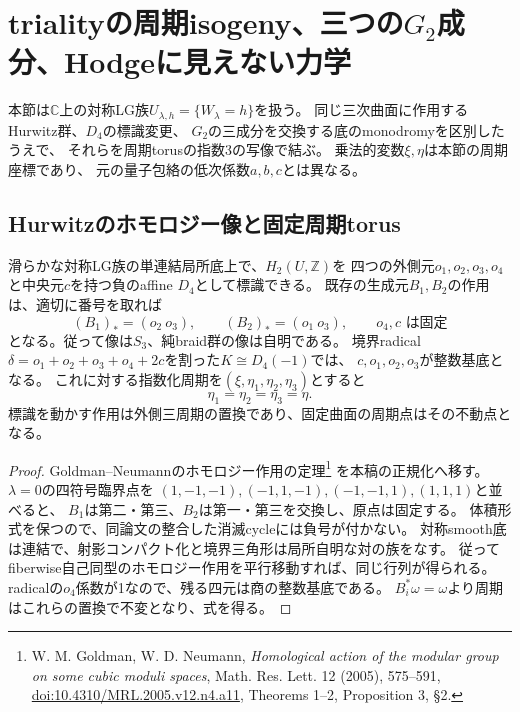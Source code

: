 \section{trialityの周期isogeny、三つの\texorpdfstring{$G_2$}{G2}成分、Hodgeに見えない力学}
\label{sec:triality-period-isogeny}
本節は$\mathbb C$上の対称LG族$U_{\lambda,h}=\{W_\lambda=h\}$を扱う。
同じ三次曲面に作用するHurwitz群、$D_4$の標識変更、
$G_2$の三成分を交換する底のmonodromyを区別したうえで、
それらを周期torusの指数3の写像で結ぶ。
乗法的変数$\xi,\eta$は本節の周期座標であり、
元の量子包絡の低次係数$a,b,c$とは異なる。

\subsection{Hurwitzのホモロジー像と固定周期torus}
\begin{proposition}[無限braid作用の有限ホモロジー像]
\label{prop:hurwitz-homology-S3}
滑らかな対称LG族の単連結局所底上で、$H_2(U,\mathbb Z)$を
四つの外側元$o_1,o_2,o_3,o_4$と中央元$c$を持つ負のaffine $D_4$として標識できる。
既存の生成元$B_1,B_2$の作用は、適切に番号を取れば
\[
 (B_1)_*=(o_2\ o_3),\qquad (B_2)_*=(o_1\ o_3),
 \qquad o_4,c\text{ は固定}
\]
となる。従って像は$S_3$、純braid群の像は自明である。
境界radical $\delta=o_1+o_2+o_3+o_4+2c$を割った$K\cong D_4(-1)$では、
$c,o_1,o_2,o_3$が整数基底となる。
これに対する指数化周期を$(\xi,\eta_1,\eta_2,\eta_3)$とすると
\begin{equation}\label{eq:triality-fixed-periods}
 \eta_1=\eta_2=\eta_3=\eta.
\end{equation}
標識を動かす作用は外側三周期の置換であり、固定曲面の周期点はその不動点となる。
\end{proposition}
\begin{proof}
Goldman--Neumannのホモロジー作用の定理\footnote{
W. M. Goldman, W. D. Neumann, \emph{Homological action of the modular group on some cubic moduli spaces},
Math. Res. Lett. 12 (2005), 575--591,
\href{https://doi.org/10.4310/MRL.2005.v12.n4.a11}{doi:10.4310/MRL.2005.v12.n4.a11},
Theorems 1--2, Proposition 3, \S2.}
を本稿の正規化へ移す。$\lambda=0$の四符号臨界点を
$(1,-1,-1),(-1,1,-1),(-1,-1,1),(1,1,1)$と並べると、
$B_1$は第二・第三、$B_2$は第一・第三を交換し、原点は固定する。
体積形式を保つので、同論文の整合した消滅cycleには負号が付かない。
対称smooth底は連結で、射影コンパクト化と境界三角形は局所自明な対の族をなす。
従ってfiberwise自己同型のホモロジー作用を平行移動すれば、同じ行列が得られる。
radicalの$o_4$係数が1なので、残る四元は商の整数基底である。
$B_i^*\omega=\omega$より周期はこれらの置換で不変となり、式を得る。
\end{proof}

